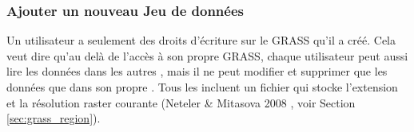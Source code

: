 \subsubsection{Ajouter un nouveau Jeu de données}\label{sec:add_mapset}


Un utilisateur a seulement des droits d'écriture sur le  GRASS qu'il a créé. Cela veut dire qu'au delà de l'accès à son propre  GRASS, chaque utilisateur peut aussi lire les données dans les autres , mais il ne peut modifier et supprimer que les données que dans son propre . Tous les  incluent un fichier  qui stocke l'extension et la résolution raster courante (Neteler \& Mitasova 2008 \cite{neteler_mitasova08}, voir Section \ref{sec:grass_region}). 


